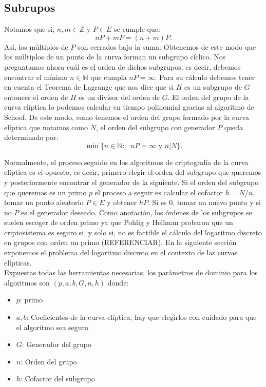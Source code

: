 \documentclass[11pt]{article}
\begin{document}
\subsection{Subrupos}
Notamos que si, $ n, m \in \mathbb{Z} $ y $ P \in E $ se cumple que:
\[
nP + mP = (n+m)P.
\]
Así, los múltiplos de $ P $ son cerrados bajo la suma. Obtenemos de este modo que los múltiplos de un punto de la curva forman un subgrupo cíclico. Nos preguntamos ahora cuál es el orden de dichos subgrupos, es decir, debemos encontrar el mínimo $ n \in \mathbb{N} $ que cumpla $ nP = \infty $. Para su cálculo debemos tener en cuenta el Teorema de Lagrange que nos dice que si $ H $ es un subgrupo de $ G $ entonces el orden de $ H $ es un divisor del orden de $ G $. El orden del grupo de la curva elíptica lo podemos calcular en tiempo polinomial gracias al algoritmo de Schoof. De este modo, como tenemos el orden del grupo formado por la curva elíptica que notamos como $ N $, el orden del subgrupo con generador $ P $ queda determinado por:
\[
\min\{ n \in \mathbb{N}:\text{ } nP = \infty \text{ y } n | N\}.
\]

Normalmente, el proceso seguido en los algoritmos de criptografía de la curva elíptica es el opuesto, es decir, primero elegir el orden del subgrupo que queremos y posteriormente encontrar el generador de la siguiente. Si el orden del subgrupo que queremos es un primo $ p $ el proceso a seguir es calcular el cofactor $ h = N/n $, tomar un punto aleatorio $ P \in E $ y obtener $ hP $. Si es 0, tomar un nuevo punto y si no $ P $ es el generador deseado. Como anotación, los órdenes de los subgrupos se suelen escoger de orden primo ya que Pohlig y Hellman probaron que un criptosistema es seguro si, y solo si, no es factible el cálculo del logaritmo discreto en grupos con orden un primo (REFERENCIAR). En la siguiente sección exponemos el problema del logaritmo discreto en el contexto de las curvas elípticas. \\

Expuestas todas las herramientas necesarias, los parámetros de dominio para los algoritmos son $ (p, a, b, G, n, h) $ donde:
\begin{itemize}
	\item $ p $: primo
	\item $ a, b $: Coeficientes de la curva elíptica, hay que elegirlos con cuidado para que el algoritmo sea seguro
	\item $ G $: Generador del grupo
	\item $ n $: Orden del grupo
	\item $ h $: Cofactor del subgrupo
\end{itemize}
\end{document}
